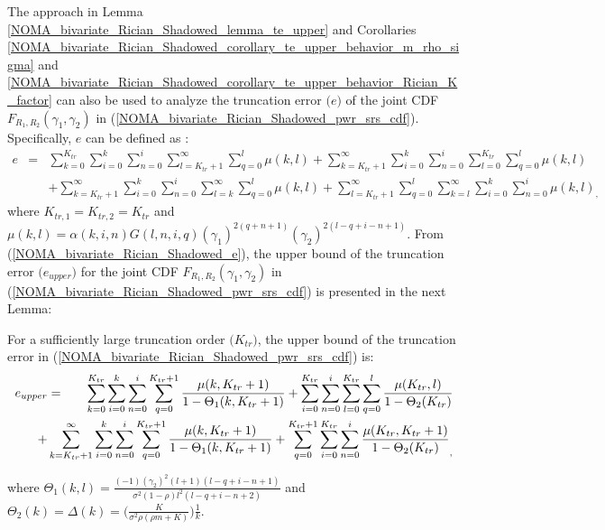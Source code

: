The approach in Lemma \ref{NOMA_bivariate_Rician_Shadowed_lemma_te_upper} and Corollaries \ref{NOMA_bivariate_Rician_Shadowed_corollary_te_upper_behavior_m_rho_sigma} and \ref{NOMA_bivariate_Rician_Shadowed_corollary_te_upper_behavior_Rician_K_factor} can also be used to analyze the truncation error $\big(e\big)$ of the joint CDF $F_{R_1,R_2}(\gamma_1,\gamma_2)$ in (\ref{NOMA_bivariate_Rician_Shadowed_pwr_srs_cdf}). Specifically, $e$ can be defined as \cite[eq. (82)]{o2011product}:
\begin{eqnarray} \label{NOMA_bivariate_Rician_Shadowed_e}
e & = & \sum_{k=0}^{K_{tr}} \sum_{i=0}^{k} \sum_{n=0}^{i} \sum_{l=K_{tr}+1}^{\infty} \sum_{q=0}^{l} \mu(k,l) + \sum_{k=K_{tr}+1}^{\infty} \sum_{i=0}^{k} \sum_{n=0}^{i} \sum_{l=0}^{K_{tr}} \sum_{q=0}^{l} \mu(k,l) \nonumber \\
	& & + \sum_{k=K_{tr}+1}^{\infty} \sum_{i=0}^{k} \sum_{n=0}^{i} \sum_{l=k}^{\infty} \sum_{q=0}^{l} \mu(k,l) + \sum_{l=K_{tr}+1}^{\infty} \sum_{q=0}^{l} \sum_{k=l}^{\infty} \sum_{i=0}^{k} \sum_{n=0}^{i} \mu(k,l)_, 
\end{eqnarray}
where $K_{tr,1} = K_{tr,2} = K_{tr}$ and $\mu(k,l) = \alpha(k,i,n) G(l,n,i,q) (\gamma_1)^{2(q+n+1)} (\gamma_2)^{2(l-q+i-n+1)}$. From (\ref{NOMA_bivariate_Rician_Shadowed_e}), the upper bound of the truncation error $\big(e_{upper}\big)$ for the joint CDF $F_{R_1,R_2}(\gamma_1,\gamma_2)$ in (\ref{NOMA_bivariate_Rician_Shadowed_pwr_srs_cdf}) is presented in the next Lemma:
\begin{lemma} \label{NOMA_bivariate_Rician_Shadowed_lemma_e_upper}
For a sufficiently large truncation order $\big(K_{tr}\big)$, the upper bound of the truncation error in (\ref{NOMA_bivariate_Rician_Shadowed_pwr_srs_cdf}) is:
\begin{eqnarray} \label{NOMA_bivariate_Rician_Shadowed_e_upper}
e_{upper} & = & \sum_{k=0}^{K_{tr}} \sum_{i=0}^{k} \sum_{n=0}^{i} \sum_{q=0}^{K_{tr}+1} \frac{\mu(k,K_{tr}+1)}{1-\Theta_1(k,K_{tr}+1)} + \sum_{i=0}^{K_{tr}} \sum_{n=0}^{i} \sum_{l=0}^{K_{tr}} \sum_{q=0}^{l} \frac{\mu(K_{tr},l)}{1-\Theta_2(K_{tr})} \nonumber \\
	& & \hspace{-1cm} + \sum_{k=K_{tr}+1}^{\infty} \sum_{i=0}^{k} \sum_{n=0}^{i} \sum_{q=0}^{K_{tr}+1} \frac{\mu(k,K_{tr}+1)}{1-\Theta_1(k,K_{tr}+1)} + \sum_{q=0}^{K_{tr}+1} \sum_{i=0}^{K_{tr}} \sum_{n=0}^{i} {\frac{\mu(K_{tr},K_{tr}+1)}{1-\Theta_2(K_{tr})}}_, 
\end{eqnarray}
\end{lemma}
where $\Theta_1(k,l) = \frac{(-1) (\gamma_2)^2 (l+1) (l-q+i-n+1)}{\sigma^2(1-\rho) l^2 (l-q+i-n+2)}$ and $\Theta_2 (k) = \Delta(k) = \Big( \frac{K}{\sigma^2 \rho (\rho m + K)} \Big)\frac{1}{k}$.

